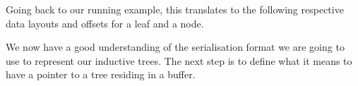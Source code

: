 Going back to our running example, this translates to the following
respective data layouts and offsets for a leaf and a node.

\begin{center}
  
\end{center}


We now have a good understanding of the serialisation format we
are going to use to represent our inductive trees.
%
The next step is to define what it means to have a pointer to a
tree residing in a buffer.
